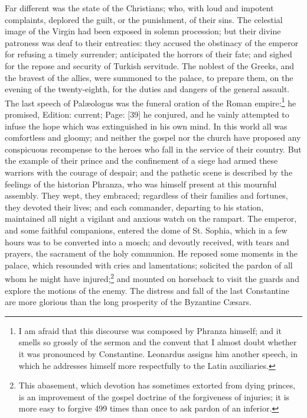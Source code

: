 Far different was the state of the Christians; who, with loud and impotent complaints, deplored the guilt, or the punishment, of their sins. The celestial image of the Virgin had been exposed in solemn procession; but their divine patroness was deaf to their entreaties: they accused the obstinacy of the emperor for refusing a timely surrender; anticipated the horrors of their fate; and sighed for the repose and security of Turkish servitude. The noblest of the Greeks, and the bravest of the allies, were summoned to the palace, to prepare them, on the evening of the twenty-eighth, for the duties and dangers of the general assault. The last speech of Palæologus was the funeral oration of the Roman empire:\footnote{I am afraid that this discourse was composed by Phranza himself; and it smells so grossly of the sermon and the convent that I almost doubt whether it was pronounced by Constantine. Leonardus assigns him another speech, in which he addresses himself more respectfully to the Latin auxiliaries.} he promised, Edition: current; Page: [39] he conjured, and he vainly attempted to infuse the hope which was extinguished in his own mind. In this world all was comfortless and gloomy; and neither the gospel nor the church have proposed any conspicuous recompense to the heroes who fall in the service of their country. But the example of their prince and the confinement of a siege had armed these warriors with the courage of despair; and the pathetic scene is described by the feelings of the historian Phranza, who was himself present at this mournful assembly. They wept, they embraced; regardless of their families and fortunes, they devoted their lives; and each commander, departing to his station, maintained all night a vigilant and anxious watch on the rampart. The emperor, and some faithful companions, entered the dome of St. Sophia, which in a few hours was to be converted into a mosch; and devoutly received, with tears and prayers, the sacrament of the holy communion. He reposed some moments in the palace, which resounded with cries and lamentations; solicited the pardon of all whom he might have injured;\footnote{This abasement, which devotion has sometimes extorted from dying princes, is an improvement of the gospel doctrine of the forgiveness of injuries; it is more easy to forgive 499 times than once to ask pardon of an inferior.} and mounted on horseback to visit the guards and explore the motions of the enemy. The distress and fall of the last Constantine are more glorious than the long prosperity of the Byzantine Cæsars.

